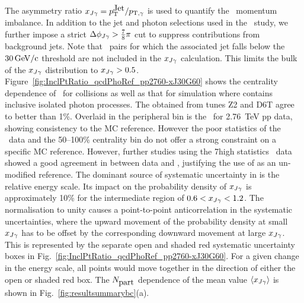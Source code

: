 The asymmetry ratio
$x_{J\gamma}= p_{\mathrm{T}}^{\mbox{Jet}}/p_{\mathrm{T},\gamma}$ is used to quantify the \photonjet\ momentum imbalance. In addition to the jet and photon selections used in
the \dphijg\ study, we further impose a strict $\Delta\phi_{J\gamma} >
\frac{7}{8}\pi$ cut to suppress contributions from background jets.
Note that \photonjet\ pairs for which the associated jet falls below the $30\,\mathrm{GeV/c}$
threshold are not included in the $x_{J\gamma}$ calculation. This limits the bulk of the $x_{J\gamma}$ distribution to 
$x_{J\gamma} > 0.5$.
Figure~\ref{fig:InclPtRatio_qcdPhoRef_pp2760-xJ30G60} shows the centrality dependence of \xjg\ for
\PbPb collisions as well as that for \PYTHYD{}
simulation where \PYTHIA{} contains inclusive isolated photon
processes. The \avexjg{} obtained from \PYTHIA{} tunes Z2 and D6T
agree to better than 1\%.
Overlaid in the peripheral bin is the \avexjg\ for 2.76~TeV pp data,
showing consistency to the MC reference. However the poor statistics
of the \pp\ data and the 50--100\% \PbPb{} centrality bin do not offer a strong constraint on a specific MC reference.
However, further studies using the 7\TeV high statistics \pp\ data showed a
good agreement in \avexjg{} between data and \PYTHIA{}, justifying the
use of \PYTHYD{} as an un-modified reference.
The dominant source of systematic uncertainty in \avexjg{} is
the relative \photonjet{} energy scale. Its impact on the probability
density of $x_{J\gamma}$ is approximately 10\%
for the intermediate region of $0.6 < x_{J\gamma} < 1.2$.
The normalisation to unity causes a point-to-point anticorrelation in the
systematic uncertainties, where the upward movement of the probability
density at small $x_{J\gamma}$ has to be offset by the corresponding downward movement
at large $x_{J\gamma}$. This is represented by the
separate open and shaded red systematic uncertainty boxes in Fig.~\ref{fig:InclPtRatio_qcdPhoRef_pp2760-xJ30G60}.
For a given change in the energy scale, all points would move together in the direction
of either the open or shaded red box.
The $N_{\mbox{part}}$ dependence of the mean value $\langle x_{J\gamma}\rangle$ is shown in Fig.~\ref{fig:resultsummarybc}(a).

